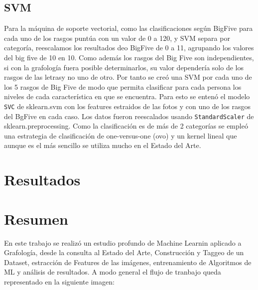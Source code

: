 \documentclass[10pt, a4paper]{article}
\begin{document}
            \subsection{SVM}
            Para la m\'aquina de soporte vectorial, como las clasificaciones seg\'un BigFive para cada uno de los rasgos punt\'ua con un valor de 0 a 120, y SVM separa por categor\'ia,
            reescalamos los resultados deo BigFive de 0 a 11, agrupando los valores del big five de 10 en 10. Como adem\'as los rasgos del Big Five son independientes, si con la grafolog\'ia fuera posible determinarlos, su valor depender\'ia solo de los rasgos de las letrasy no uno de otro.
            Por tanto se cre\'o una SVM por cada uno de los 5 rasgos de Big Five de modo que permita clasificar para cada persona los niveles de cada caracter\'istica en que se encuentra. Para esto se enten\'o el modelo \texttt{SVC} de sklearn.svm con los features estraidos de las fotos y con uno de los rasgos del BgFive en cada caso.
            Los datos fueron reescalados usando \texttt{StandardScaler} de sklearn.preprocessing.
            Como la clasificaci\'on es de m\'as de 2 categor\'ias se emple\'o una estrategia de clasificaci\'on de one-versus-one (ovo) y un kernel lineal que aunque es el m\'as sencillo se utiliza mucho en el Estado del Arte.

    \section{Resultados}

    \section{Resumen}
        En este trabajo se realiz\'o un estudio profundo de Machine Learnin aplicado a Grafolog\'ia, desde la consulta al Estado del Arte, Construcci\'on y Taggeo de 
        un Dataset, estracci\'on de Features de las im\'agenes, entrenamiento de Algoritmos de ML y an\'alisis de resultados. A modo general el flujo de tranbajo queda representado 
        en la siguiente imagen: 
\end{document}
